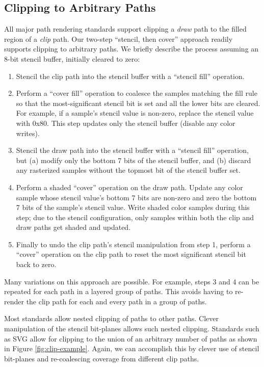 \subsection{Clipping to Arbitrary Paths}

All major path rendering standards support clipping a {\em draw}
path to the filled region of a {\em clip} path.
Our two-step ``stencil, then cover'' approach readily supports clipping
to arbitrary paths.  We briefly describe the process assuming an 8-bit
stencil buffer, initially cleared to zero:
\begin{enumerate}
  \item Stencil the clip path into the stencil buffer with a ``stencil
  fill'' operation.
  \item Perform a ``cover fill'' operation to coalesce the samples
  matching the fill rule so that the most-significant stencil bit is
  set and all the lower bits are cleared.  For example, if a sample's stencil
  value is non-zero, replace the stencil value with 0x80.
  This step updates only the stencil buffer (disable any color writes).
  \item Stencil the draw path into the stencil buffer with a ``stencil
  fill'' operation, but (a) modify only the bottom 7 bits of the stencil
  buffer, and (b) discard any rasterized samples without the topmost
  bit of the stencil buffer set.
  \item Perform a shaded ``cover'' operation on the draw path.  Update any
  color sample whose stencil value's bottom 7 bits are non-zero and
  zero the bottom 7 bits of the sample's stencil value.  Write shaded
  color samples during this step; due to the stencil configuration, only
  samples within both the clip and draw paths get shaded and updated.
  \item Finally to undo the clip path's stencil manipulation from step
  1, perform a ``cover'' operation on the clip path to reset the most
  significant stencil bit back to zero.
\end{enumerate}
Many variations on this approach are possible.  For example, steps
3 and 4 can be repeated for each path in a layered group of paths.
This avoids having to re-render the clip path for each and every path
in a group of paths.

Most standards allow nested clipping of paths to other paths.  Clever
manipulation of the stencil bit-planes allows such nested clipping.
Standards such as SVG allow for clipping to the union of an arbitrary
number of paths as shown in Figure \ref{fig:clip-example}.  Again, we can
accomplish this by clever use of stencil bit-planes and re-coalescing
coverage from different clip paths.

